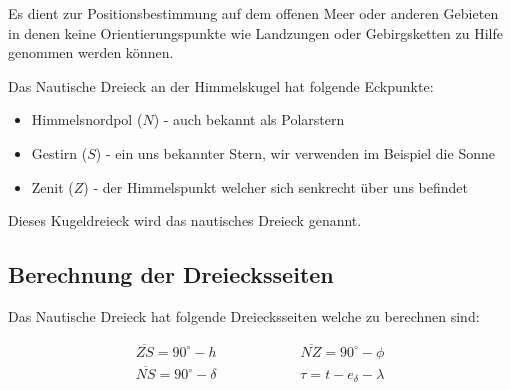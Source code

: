 \begin{refsection}
Es dient zur Positionsbestimmung auf dem offenen Meer oder anderen Gebieten in denen keine Orientierungspunkte wie Landzungen oder Gebirgsketten zu Hilfe genommen werden können.

Das Nautische Dreieck an der Himmelskugel hat folgende Eckpunkte:
\begin{itemize}
\item Himmelsnordpol ($N$) - auch bekannt als Polarstern
\item Gestirn ($S$) - ein uns bekannter Stern, wir verwenden im Beispiel die Sonne
\item Zenit ($Z$) - der Himmelspunkt welcher sich senkrecht über uns befindet
\end{itemize}

Dieses Kugeldreieck wird das nautisches Dreieck genannt.


\subsection{Berechnung der Dreiecksseiten}
Das Nautische Dreieck hat folgende Dreiecksseiten welche zu berechnen sind:

\begin{align*}
\overline{ZS} = 90^{\circ} - h \quad \quad \quad \quad \quad \quad 
\overline{NZ} = 90^{\circ} - \phi \\
\overline{NS} = 90^{\circ} - \delta \quad \quad \quad \quad \quad \quad 
\tau = t - e_\delta - \lambda 
\end{align*}



\end{refsection}
